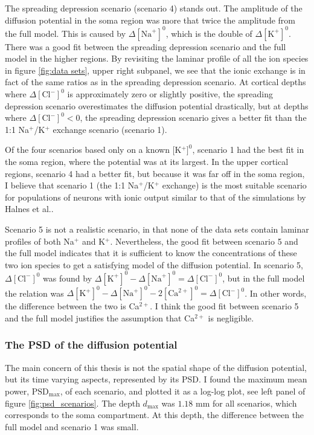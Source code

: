 \documentclass{article}
\begin{document}
The spreading depression scenario (scenario 4) stands out. The amplitude of the diffusion potential in the soma region was more that twice the amplitude from the full model. This is caused by $\Delta [\text{Na}^+]^0$, which is the double of $\Delta[\text{K}^+]^0$. There was a good fit between the spreading depression scenario and the full model in the higher regions. By revisiting the laminar profile of all the ion species in figure \ref{fig:data sets}, upper right subpanel, we see that the ionic exchange is in fact of the same ratios as in the spreading depression scenario. At cortical depths where $\Delta [\text{Cl}^-]^0$ is approximately zero or slightly positive, the spreading depression scenario overestimates the diffusion potential drastically, but at depths where  $\Delta [\text{Cl}^-]^0<0$, the spreading depression scenario gives a better fit than the 1:1 Na$^+$/K$^+$ exchange scenario (scenario 1).


Of the four scenarios based only on a known [K$^+]^0$, scenario 1 had the best fit in the soma region, where the potential was at its largest. In the upper cortical regions, scenario 4 had a better fit, but because it was far off in the soma region, I believe that scenario 1 (the 1:1 Na$^+$/K$^+$ exchange) is the most suitable scenario for populations of neurons with ionic output similar to that of the simulations by Halnes et al.. 

Scenario 5 is not a realistic scenario, in that none of the data sets contain laminar profiles of both Na$^+$ and K$^+$. Nevertheless, the good fit between scenario 5 and the full model indicates that it is sufficient to know the concentrations of these two ion species to get a satisfying model of the diffusion potential. In scenario 5, $\Delta[\text{Cl}^-]^0$ was found by $\Delta[\text{K}^+]^0-\Delta [\text{Na}^+]^0=\Delta [\text{Cl}^-]^0$, but in the full model the relation was $\Delta[\text{K}^+]^0-\Delta [\text{Na}^+]^0 -2[\text{Ca}^{2+}]^0=\Delta [\text{Cl}^-]^0$. In other words, the difference between the two is Ca$^{2+}$. I think the good fit between scenario 5 and the full model justifies the assumption that Ca$^{2+}$ is negligible. 

\subsubsection{The PSD of the diffusion potential}
The main concern of this thesis is not the spatial shape of the diffusion potential, but its time varying aspects, represented by its PSD. I found the maximum mean power, $\text{PSD}_{\text{max}}$, of each scenario, and plotted it as a log-log plot, see left panel of figure \ref{fig:psd_scenarios}. The depth $d_{\text{max}}$ was $1.18$ mm for all scenarios, which corresponds to the soma compartment. At this depth, the difference between the full model and scenario 1 was small.
\end{document}
